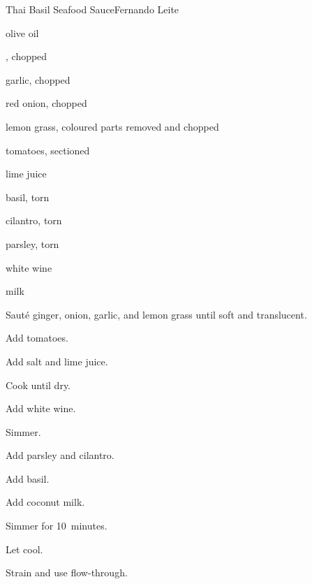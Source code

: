\begin{recipe}{Thai Basil Seafood Sauce}{Fernando Leite}{}

\begin{ingredients}
\item olive oil
\item {}, chopped
\item garlic, chopped
\item red onion, chopped
\item lemon grass, coloured parts removed and chopped
\item tomatoes, sectioned
\item lime juice
\item {} basil, torn
\item \C{\half} cilantro, torn
\item \C{\half} parsley, torn
\item \C{\quarter} white wine
\item \C{\half}  milk
\end{ingredients}

\begin{directions}
\item Saut\'e ginger, onion, garlic, and lemon grass until soft and translucent.
\item Add tomatoes.
\item Add salt and lime juice.
\item Cook until dry.
\item Add white wine.
\item Simmer.
\item Add parsley and cilantro.
\item Add basil.
\item Add coconut milk.
\item Simmer for 10~minutes.
\item Let cool.
\item Strain and use flow-through.
\end{directions}

\end{recipe}
